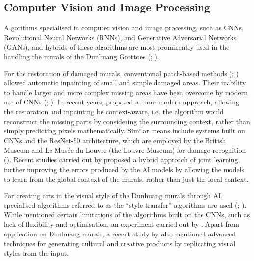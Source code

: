 \subsection{Computer Vision and Image Processing}
\label{sec:computer-vision-image-processing}

Algorithms specialised in computer vision and image processing, such as CNNs, Revolutional Neural Networks
(RNNs), and Generative Adversarial Networks (GANs), and hybrids of these algorithms are most prominently
used in the handling the murals of the Dunhuang Grottoes (;
).

For the restoration of damaged murals, conventional patch-based methods
(; )
allowed automatic inpainting of small and simple damaged areas. Their inability to handle larger and more complex
missing areas have been overcome by modern use of CNNs (;
).
In recent years,  proposed a more modern approach,
allowing the restoration and inpainting be context-aware, i.e. the algorithm would reconstruct the missing parts
by considering the surrounding context, rather than simply predicting pixels mathematically.
Similar means include systems built on CNNs and the ResNet-50 architecture, which are employed by the British
Museum and Le Musée du Louvre (the Louvre Museum) for damage recognition
().
Recent studies carried out by  proposed a hybrid approach of joint
learning, further improving the errors produced by the AI models by allowing the models to learn from the global
context of the murals, rather than just the local context.

For creating arts in the visual style of the Dunhuang murals through AI, specialised algorithms referred to as
the ``style transfer'' algorithms are used (;
). While  mentioned certain limitations of the
algorithms built on the CNNs, such as lack of flexibility and optimisation, an experiment carried out by 
.
Apart from application on Dunhuang murals,
a recent study by  also mentioned advanced techniques for generating
cultural and creative products by replicating visual styles from the input.

